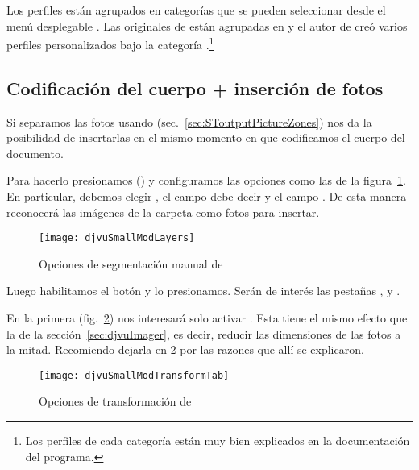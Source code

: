 \documentclass[%
	a5paper,
	10pt,
	twoside,
	openright,
	final,
]{memoir}
\begin{document}
{	Los perfiles están agrupados en categorías que se pueden seleccionar desde el menú desplegable . Las originales de \dexpress están agrupadas en  y el autor de \djvusmallmod creó varios perfiles personalizados bajo la categoría .\footnote{Los perfiles de cada categoría están muy bien explicados en la documentación del programa.}

	\subsection{Codificación del cuerpo + inserción de fotos\label{sec:djvuSmallModPhotos}} Si separamos las fotos usando \scantailor (sec.~\ref{sec:SToutputPictureZones}) \djvusmallmod nos da la posibilidad de insertarlas en el mismo momento en que codificamos el cuerpo del documento.

	Para hacerlo presionamos \keys{\faFilter} () y configuramos las opciones como las de la figura~\ref{fig:djvuSmallModLayers}. En particular, debemos elegir , el campo  debe decir  y el campo  . De esta manera reconocerá las imágenes de la carpeta  como fotos para insertar.

	\begin{figure}
		\texttt{[image: djvuSmallModLayers]}
		\caption{Opciones de segmentación manual de \djvusmallmod\label{fig:djvuSmallModLayers}}
	\end{figure}

	Luego habilitamos el botón  y lo presionamos. Serán de interés las pestañas ,  y .

	En la primera (fig.~\ref{fig:djvuSmallModTransformTab}) nos interesará solo activar . Esta tiene el mismo efecto que la  de la sección~\ref{sec:djvuImager}, es decir, reducir las dimensiones de las fotos a la mitad. Recomiendo dejarla en 2 por las razones que allí se explicaron.

	\begin{figure}
		\texttt{[image: djvuSmallModTransformTab]}
		\caption{Opciones de transformación de \djvusmallmod\label{fig:djvuSmallModTransformTab}}
	\end{figure}

}
\end{document}
